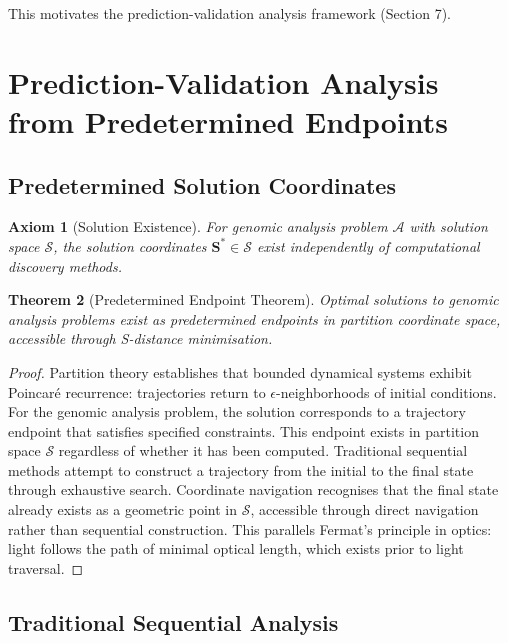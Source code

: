 \documentclass[11pt,a4paper]{article}
\newtheorem{theorem}{Theorem}[section]
\newtheorem{axiom}[theorem]{Axiom}
\theoremstyle{remark}
\newcommand{\Scoord}{\mathbf{S}}
\begin{document}
This motivates the prediction-validation analysis framework (Section 7).

\section{Prediction-Validation Analysis from Predetermined Endpoints}

\subsection{Predetermined Solution Coordinates}

\begin{axiom}[Solution Existence]
\label{ax:solution_existence}
For genomic analysis problem $\mathcal{A}$ with solution space $\mathcal{S}$, the solution coordinates $\Scoord^* \in \mathcal{S}$ exist independently of computational discovery methods.
\end{axiom}

\begin{theorem}[Predetermined Endpoint Theorem]
\label{thm:predetermined_endpoint}
Optimal solutions to genomic analysis problems exist as predetermined endpoints in partition coordinate space, accessible through S-distance minimisation.
\end{theorem}

\begin{proof}
Partition theory establishes that bounded dynamical systems exhibit Poincaré recurrence: trajectories return to $\epsilon$-neighborhoods of initial conditions. For the genomic analysis problem, the solution corresponds to a trajectory endpoint that satisfies specified constraints. This endpoint exists in partition space $\mathcal{S}$ regardless of whether it has been computed. Traditional sequential methods attempt to construct a trajectory from the initial to the final state through exhaustive search. Coordinate navigation recognises that the final state already exists as a geometric point in $\mathcal{S}$, accessible through direct navigation rather than sequential construction. This parallels Fermat's principle in optics: light follows the path of minimal optical length, which exists prior to light traversal.
\end{proof}

\subsection{Traditional Sequential Analysis}
\end{document}
